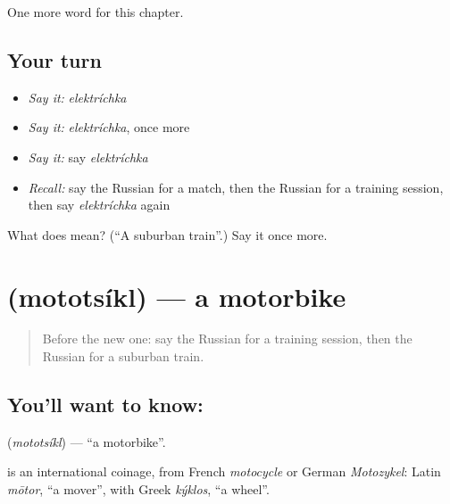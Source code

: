 \begin{grammarlens}[title={What you've built}]
One more word for this chapter.
\end{grammarlens}

\subsection*{Your turn}
\begin{itemize}
\raggedright
  \item \emph{Say it:} \emph{elektríchka}
  \item \emph{Say it:} \emph{elektríchka}, once more
  \item \emph{Say it:} say \emph{elektríchka}
  \item \emph{Recall:} say the Russian for a match, then the Russian for a training session, then say \emph{elektríchka} again
\end{itemize}

\begin{tcolorbox}[breakable,colback=teal!4,colframe=teal!35!black,title={Before you move on}]
What does  mean? (\textquotedblleft{}A suburban train\textquotedblright{}.) Say it once more.
\end{tcolorbox}
\section[\texorpdfstring{\ru{мотоцикл} (mototsíkl)}{мотоцикл (mototsíkl)}]{ (mototsíkl) — a motorbike}

\label{lesson:RU-C167-mototsikl}



\begin{quote}
Before the new one: say the Russian for a training session, then the Russian for a suburban train.
\end{quote}

\subsection*{You'll want to know: }
\textbf{} (\emph{mototsíkl}) — \textquotedblleft{}a motorbike\textquotedblright{}.

\begin{cousinweb}
\textbf{} is an international coinage, from French \emph{motocycle} or German \emph{Motozykel}: Latin \emph{mōtor}, \textquotedblleft{}a mover\textquotedblright{}, with Greek \emph{kýklos}, \textquotedblleft{}a wheel\textquotedblright{}.
\end{cousinweb}

